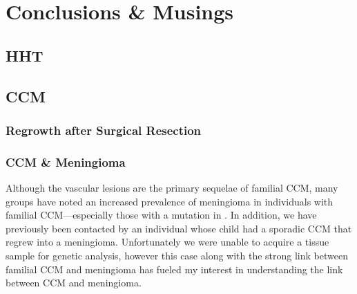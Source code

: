 \chapter{Conclusions \& Musings}
\clearpage





\section{HHT}






\section{CCM}
\subsection{Regrowth after Surgical Resection}




\subsection{CCM \& Meningioma}
Although the vascular lesions are the primary sequelae of familial CCM, many groups have noted an increased prevalence of meningioma in individuals with familial CCM—especially those with a mutation in  \citep{labauge2009, riant2013, garaci2015}. In addition, we have previously been contacted by an individual whose child had a sporadic CCM that regrew into a meningioma. Unfortunately we were unable to acquire a tissue sample for genetic analysis, however this case along with the strong link between familial CCM and meningioma has fueled my interest in understanding the link between CCM and meningioma. 
